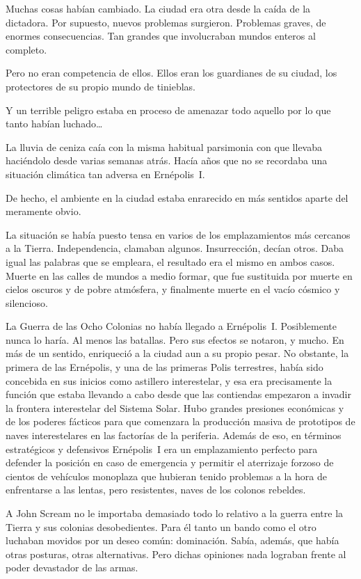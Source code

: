 Muchas cosas habían cambiado. La ciudad era otra desde la caída de la dictadora. Por supuesto, nuevos problemas surgieron. Problemas graves, de enormes consecuencias. Tan grandes que involucraban mundos enteros al completo.

Pero no eran competencia de ellos. Ellos eran los guardianes de su ciudad, los protectores de su propio mundo de tinieblas.

Y un terrible peligro estaba en proceso de amenazar todo aquello por lo que tanto habían luchado\dots

\fancyparbreak
La lluvia de ceniza caía con la misma habitual parsimonia con que llevaba haciéndolo desde varias semanas atrás. Hacía años que no se recordaba una situación climática tan adversa en Ernépolis~I.

De hecho, el ambiente en la ciudad estaba enrarecido en más sentidos aparte del meramente obvio.

La situación se había puesto tensa en varios de los emplazamientos más cercanos a la Tierra. Independencia, clamaban algunos. Insurrección, decían otros. Daba igual las palabras que se empleara, el resultado era el mismo en ambos casos. Muerte en las calles de mundos a medio formar, que fue sustituida por muerte en cielos oscuros y de pobre atmósfera, y finalmente muerte en el vacío cósmico y silencioso.

La Guerra de las Ocho Colonias no había llegado a Ernépolis~I. Posiblemente nunca lo haría. Al menos las batallas. Pero sus efectos se notaron, y mucho. En más de un sentido, enriqueció a la ciudad aun a su propio pesar. No obstante, la primera de las Ernépolis, y una de las primeras Polis terrestres, había sido concebida en sus inicios como astillero interestelar, y esa era precisamente la función que estaba llevando a cabo desde que las contiendas empezaron a invadir la frontera interestelar del Sistema Solar. Hubo grandes presiones económicas y de los poderes fácticos para que comenzara la producción masiva de prototipos de naves interestelares en las factorías de la periferia. Además de eso, en términos estratégicos y defensivos Ernépolis~I era un emplazamiento perfecto para defender la posición en caso de emergencia y permitir el aterrizaje forzoso de cientos de vehículos monoplaza que hubieran tenido problemas a la hora de enfrentarse a las lentas, pero resistentes, naves de los colonos rebeldes.

A John Scream no le importaba demasiado todo lo relativo a la guerra entre la Tierra y sus colonias desobedientes. Para él tanto un bando como el otro luchaban movidos por un deseo común: dominación. Sabía, además, que había otras posturas, otras alternativas. Pero dichas opiniones nada lograban frente al poder devastador de las armas.

